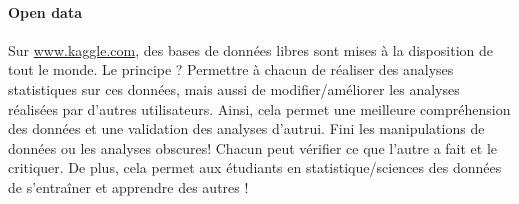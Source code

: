 \documentclass[10pt]{../fiche}
\begin{document}
\paragraph{Open data} Sur \url{www.kaggle.com}, des bases de données libres sont mises à la disposition de tout le monde. Le principe ? Permettre à chacun de réaliser des analyses statistiques sur ces données, mais aussi de modifier/améliorer les analyses réalisées par d'autres utilisateurs. Ainsi, cela permet une meilleure compréhension des données et une validation des analyses d'autrui. Fini les manipulations de données ou les analyses obscures! Chacun peut vérifier ce que l'autre a fait et le critiquer. De plus, cela permet aux étudiants en statistique/sciences des données de s'entraîner et apprendre des autres !
\end{document}
